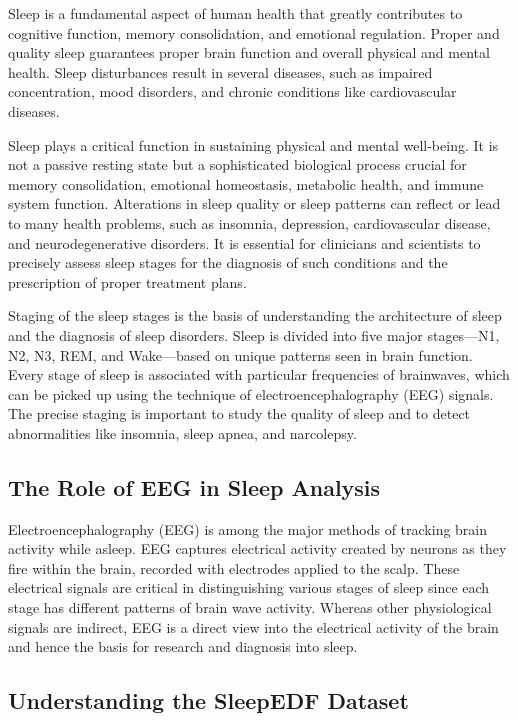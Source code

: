 Sleep is a fundamental aspect of human health that greatly contributes to cognitive function, memory consolidation, and emotional regulation. Proper and quality sleep guarantees proper brain function and overall physical and mental health. Sleep disturbances result in several diseases, such as impaired concentration, mood disorders, and chronic conditions like cardiovascular diseases.

Sleep plays a critical function in sustaining physical and mental well-being. It is not a passive resting state but a sophisticated biological process crucial for memory consolidation, emotional homeostasis, metabolic health, and immune system function. Alterations in sleep quality or sleep patterns can reflect or lead to many health problems, such as insomnia, depression, cardiovascular disease, and neurodegenerative disorders. It is essential for clinicians and scientists to precisely assess sleep stages for the diagnosis of such conditions and the prescription of proper treatment plans.


Staging of the sleep stages is the basis of understanding the architecture of sleep and the diagnosis of sleep disorders. Sleep is divided into five major stages—N1, N2, N3, REM, and Wake—based on unique patterns seen in brain function. Every stage of sleep is associated with particular frequencies of brainwaves, which can be picked up using the technique of electroencephalography (EEG) signals. The precise staging is important to study the quality of sleep and to detect abnormalities like insomnia, sleep apnea, and narcolepsy.






\subsection{The Role of EEG in Sleep Analysis}

Electroencephalography (EEG) is among the major methods of tracking brain activity while asleep. EEG captures electrical activity created by neurons as they fire within the brain, recorded with electrodes applied to the scalp. These electrical signals are critical in distinguishing various stages of sleep since each stage has different patterns of brain wave activity. Whereas other physiological signals are indirect, EEG is a direct view into the electrical activity of the brain and hence the basis for research and diagnosis into sleep.

\subsection{Understanding the SleepEDF Dataset}

